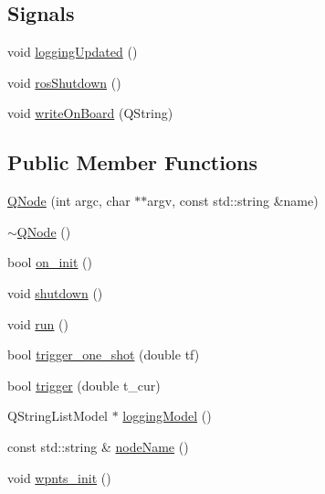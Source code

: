 \subsection*{Signals}
\begin{DoxyCompactItemize}
\item 
void \hyperlink{class_q_node_abddcd4e0187f6d4513bbee7ba4656827}{logging\+Updated} ()
\item 
void \hyperlink{class_q_node_a7888b171c93c5f47334f5d2815adf445}{ros\+Shutdown} ()
\item 
void \hyperlink{class_q_node_a80d139522a1333db2c6ea33914c32378}{write\+On\+Board} (Q\+String)
\end{DoxyCompactItemize}
\subsection*{Public Member Functions}
\begin{DoxyCompactItemize}
\item 
\hyperlink{class_q_node_af26ee8c152283b4a1999dc5d4bd67908}{Q\+Node} (int argc, char $\ast$$\ast$argv, const std\+::string \&name)
\item 
\hyperlink{class_q_node_afed12669e9aed3e70721f507804778ca}{$\sim$\+Q\+Node} ()
\item 
bool \hyperlink{class_q_node_a32d00dbcf15c277e08caabf95af04f6e}{on\+\_\+init} ()
\item 
void \hyperlink{class_q_node_a770568addece696138f515d38408ff5c}{shutdown} ()
\item 
void \hyperlink{class_q_node_ae585b201389c51a177fa5e2fde252c84}{run} ()
\item 
bool \hyperlink{class_q_node_a65f0fc9f27f336150f33b53a7c51d80b}{trigger\+\_\+one\+\_\+shot} (double tf)
\item 
bool \hyperlink{class_q_node_a23bd7e0744ad4c7b5d5464485375bef1}{trigger} (double t\+\_\+cur)
\item 
Q\+String\+List\+Model $\ast$ \hyperlink{class_q_node_a0a6dae02f9e317488095367203fa8a58}{logging\+Model} ()
\item 
const std\+::string \& \hyperlink{class_q_node_ac21ae24311df97ac0e15c97179763b0e}{node\+Name} ()
\item 
void \hyperlink{class_q_node_a2b1b82bfd6e5e6187fe8216ba840bb09}{wpnts\+\_\+init} ()
\end{DoxyCompactItemize}
